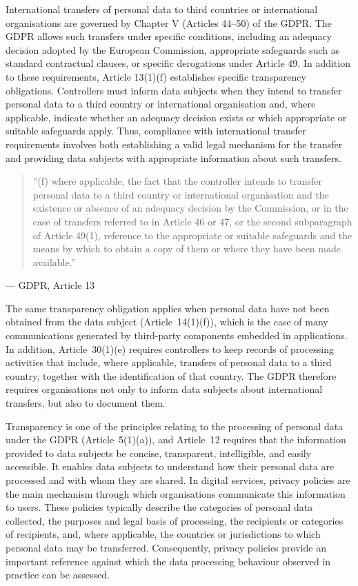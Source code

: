 \documentclass[
A4paper,                %
twoside,                %
openright,              %
chapterprefix=true,     %
12pt,                   %
headings=normal,        %
titlepage=on            %
]{book}
\begin{document}
International transfers of personal data to third countries or international organisations are governed by Chapter V (Articles 44--50) of the GDPR. The GDPR allows such transfers under specific conditions, including an adequacy decision adopted by the European Commission, appropriate safeguards such as standard contractual clauses, or specific derogations under Article 49. In addition to these requirements, Article 13(1)(f) establishes specific transparency obligations. Controllers must inform data subjects when they intend to transfer personal data to a third country or international organisation and, where applicable, indicate whether an adequacy decision exists or which appropriate or suitable safeguards apply. Thus, compliance with international transfer requirements involves both establishing a valid legal mechanism for the transfer and providing data subjects with appropriate information about such transfers. 

\begin{quote}
    ''(f) where applicable, the fact that the controller intends to transfer personal data to a third country or international organisation and the existence or absence of an adequacy decision by the Commission, or in the case of transfers referred to in Article 46 or 47, or the second subparagraph of Article 49(1), reference to the appropriate or suitable safeguards and the means by which to obtain a copy of them or where they have been made available.''
\end{quote}
\hfill --- GDPR, Article 13 \cite{REGULATIONSRelevance}

The same transparency obligation applies when personal data have not been obtained from the data subject (Article~14(1)(f)), which is the case of many communications generated by third-party components embedded in applications. In addition, Article~30(1)(e) requires controllers to keep records of processing activities that include, where applicable, transfers of personal data to a third country, together with the identification of that country. The GDPR therefore requires organisations not only to inform data subjects about international transfers, but also to document them.

Transparency is one of the principles relating to the processing of personal data under the GDPR (Article~5(1)(a)), and Article~12 requires that the information provided to data subjects be concise, transparent, intelligible, and easily accessible. It enables data subjects to understand how their personal data are processed and with whom they are shared. In digital services, privacy policies are the main mechanism through which organisations communicate this information to users. These policies typically describe the categories of personal data collected, the purposes and legal basis of processing, the recipients or categories of recipients, and, where applicable, the countries or jurisdictions to which personal data may be transferred. Consequently, privacy policies provide an important reference against which the data processing behaviour observed in practice can be assessed.
\end{document}

